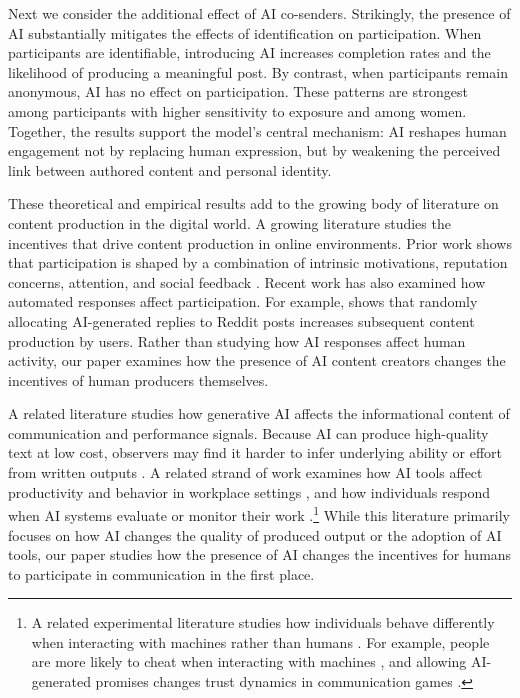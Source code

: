 \documentclass[12pt,notitlepage]{article}
\theoremstyle{plain}
\theoremstyle{plain}
\theoremstyle{definition}
\theoremstyle{definition}
\theoremstyle{assumption}
\theoremstyle{plain}
\theoremstyle{plain}
\theoremstyle{plain}
\theoremstyle{plain}
\theoremstyle{definition}%
\theoremstyle{plain}
\theoremstyle{plain}
\theoremstyle{plain}
\theoremstyle{plain}
\begin{document}
Next we consider the additional effect of AI co-senders. Strikingly, the presence of AI substantially mitigates the effects of identification on participation. When participants are identifiable, introducing AI increases completion rates and the likelihood of producing a meaningful post. By contrast, when participants remain anonymous, AI has no effect on participation. These patterns are strongest among participants with higher sensitivity to exposure and among women. Together, the results support the model's central mechanism: AI reshapes human engagement not by replacing human expression, but by weakening the perceived link between authored content and personal identity.

These theoretical and empirical results add to the growing body of literature on content production in the digital world. A growing literature studies the incentives that drive content production in online environments. Prior work shows that participation is shaped by a combination of intrinsic motivations, reputation concerns, attention, and social feedback \citep{aridor2024economics}. Recent work has also examined how automated responses affect participation. For example, \citet{srinivasan2023} shows that randomly allocating AI-generated replies to Reddit posts increases subsequent content production by users. Rather than studying how AI responses affect human activity, our paper examines how the presence of AI content creators changes the incentives of human producers themselves.

A related literature studies how generative AI affects the informational content of communication and performance signals. Because AI can produce high-quality text at low cost, observers may find it harder to infer underlying ability or effort from written outputs \citep{cowgill2024cheapen,cui2025signaling,galdin2025making}. A related strand of work examines how AI tools affect productivity and behavior in workplace settings \citep{noy2023experimental,brynjolfsson2024generative,almog2025barriers}, and how individuals respond when AI systems evaluate or monitor their work \citep{almoggauriotpage2025oversight,almoglippmanmartin2026judges}.\footnote{A related experimental literature studies how individuals behave differently when interacting with machines rather than humans \citep{chugunova2022we}. For example, people are more likely to cheat when interacting with machines \citep{marechal2020}, and allowing AI-generated promises changes trust dynamics in communication games \citep{bogliacino2023}.} While this literature primarily focuses on how AI changes the quality of produced output or the adoption of AI tools, our paper studies how the presence of AI changes the incentives for humans to participate in communication in the first place.
\end{document}
